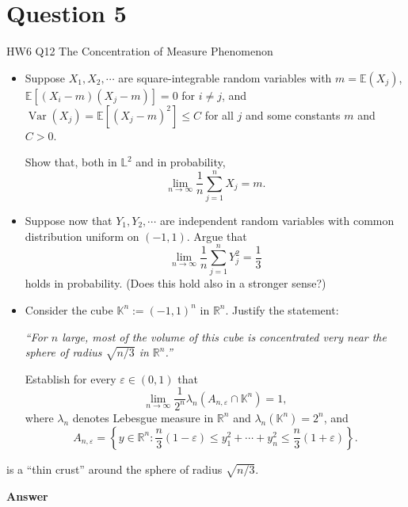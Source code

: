 \documentclass[letterpaper]{article}
\begin{document}
		
		\clearpage
		
		\section{Question 5}
		
		{\color{deepred} HW6 Q12 The Concentration of Measure Phenomenon}
			
			\begin{itemize}
				
				\item[(i)] Suppose $X_1,X_2,\cdots$ are square-integrable random variables with
				$m=\mathbb{E}(X_j)$,
				$\mathbb{E}[(X_i-m)(X_j-m)]=0$ for $i\ne j$, and
				$\operatorname{Var}(X_j)=\mathbb{E}[(X_j-m)^2]\le C$
				for all $j$ and some constants $m$ and $C>0$.
				
				Show that, both in $\mathbb{L}^2$ and in probability,
				\[
				\lim_{n\to\infty}\frac{1}{n}\sum_{j=1}^n X_j = m.
				\]
				
				\item[(ii)] Suppose now that $Y_1,Y_2,\cdots$ are independent random variables with
				common distribution uniform on $(-1,1)$.
				Argue that
				\[
				\lim_{n\to\infty}\frac{1}{n}\sum_{j=1}^n Y_j^2=\frac{1}{3}
				\]
				holds in probability. (Does this hold also in a stronger sense?)
				
				\item[(iii)] Consider the cube $\mathbb{K}^n := (-1,1)^n$ in $\mathbb{R}^n$.
				Justify the statement:
				
				\emph{``For $n$ large, most of the volume of this cube is concentrated very
					near the sphere of radius $\sqrt{n/3}$ in $\mathbb{R}^n$.''}
				
				Establish for every $\varepsilon\in(0,1)$ that
				\[
				\lim_{n\to\infty}
				\frac{1}{2^n}\lambda_n\!\left(A_{n,\varepsilon}\cap\mathbb{K}^n\right)=1,
				\]
				where $\lambda_n$ denotes Lebesgue measure in $\mathbb{R}^n$ and
				$\lambda_n(\mathbb{K}^n)=2^n$, and
				\[
				A_{n,\varepsilon}
				=
				\left\{
				y\in\mathbb{R}^n:
				\frac{n}{3}(1-\varepsilon)
				\le
				y_1^2+\cdots+y_n^2
				\le
				\frac{n}{3}(1+\varepsilon)
				\right\}.
				\]
				
			\end{itemize}
		
		is a ``thin crust'' around the sphere of radius $\sqrt{n/3}$.
		
		\textbf{Answer} 
		
\end{document}
